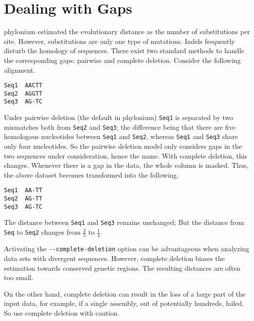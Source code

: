 \documentclass[a4paper,10pt,english]{scrartcl}
\newcommand{\phylonium}{\textsf{phylonium}\xspace}
\begin{document}
\section{Dealing with Gaps}

\phylonium estimated the evolutionary distance as the number of substitutions per site.  However, substitutions are only one type of mutations. Indels frequently disturb the homology of sequences. There exist two standard methods to handle the corresponding gaps: pairwise and complete deletion. Consider the following alignment.

\begin{lstlisting}[columns=fixed]
Seq1  AACTT
Seq2  AGGTT
Seq3  AG-TC
\end{lstlisting}

Under pairwise deletion (the default in \phylonium) \lstinline!Seq1! is separated by two mismatches both from \lstinline!Seq2! and \lstinline!Seq3!; the difference being that there are five homologous nucleotides between \lstinline!Seq1! and \lstinline!Seq2!, whereas \lstinline!Seq1! and \lstinline!Seq3! share only four nucleotides. So the pairwise deletion model only considers gaps in the two sequences under consideration, hence the name. With complete deletion, this changes. Whenever there is a gap in the data, the whole column is masked. Thus, the above dataset becomes transformed into the following.

\begin{lstlisting}[columns=fixed]
Seq1  AA-TT
Seq2  AG-TT
Seq3  AG-TC
\end{lstlisting}

The distance between \lstinline!Seq1! and \lstinline!Seq3! remains unchanged; But the distance from \lstinline!Seq! to \lstinline!Seq2! changes from $\frac{2}{5}$ to $\frac{1}{4}$.

Activating the \lstinline!--complete-deletion! option can be advantageous when analyzing data sets with divergent sequences. However, complete deletion biases the estimation towards conserved genetic regions. The resulting distances are often too small. 

On the other hand, complete deletion can result in the loss of a large part of the input data, for example, if a single assembly, out of potentially hundreds, failed. So use complete deletion with caution.
\end{document}
